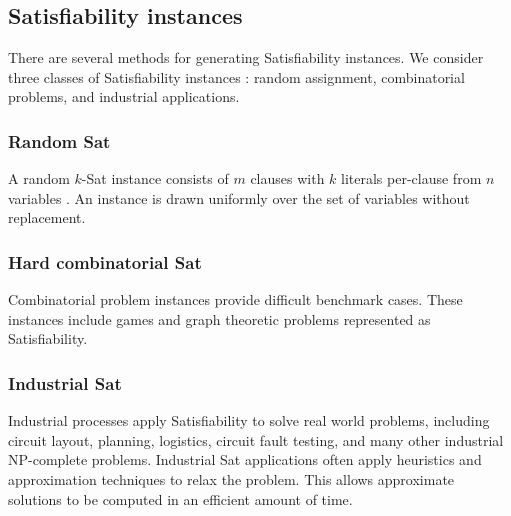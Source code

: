 	\subsection{{\sc Satisfiability} instances}
		
There are several methods for generating {\sc Satisfiability} instances.  We consider three classes of {\sc Satisfiability} instances \cite{satcompetition}: random assignment, combinatorial problems, and industrial applications.
	
\subsubsection{Random {\sc Sat}}
A random $k$-{\sc Sat} instance consists of $m$ clauses with $k$ literals per-clause from $n$ variables \cite{wilsonKsat}.  An instance is drawn uniformly over the set of variables without replacement.

		

\subsubsection{Hard combinatorial {\sc Sat}}

Combinatorial problem instances provide difficult benchmark cases.  These instances include games and graph theoretic problems represented as {\sc Satisfiability}. 
		
\subsubsection{Industrial {\sc Sat}}

Industrial processes apply {\sc Satisfiability} to solve real world problems, including circuit layout, planning, logistics, circuit fault testing, and many other industrial \textsf{NP-complete} problems.  Industrial {\sc Sat} applications often apply heuristics and approximation techniques to relax the problem.  This allows approximate solutions to be computed in an efficient amount of time.
